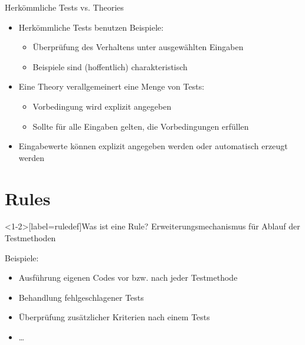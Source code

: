 \begin{frame}{Herkömmliche Tests vs. Theories}
	\begin{itemize}
		\item Herkömmliche Tests benutzen Beispiele:
			\begin{itemize}
				\item Überprüfung des Verhaltens unter ausgewählten Eingaben
				\item Beispiele sind (hoffentlich) charakteristisch
			\end{itemize}
		\item Eine Theory verallgemeinert eine Menge von Tests:
			\begin{itemize}
				\item Vorbedingung wird explizit angegeben
				\item Sollte für alle Eingaben gelten, die Vorbedingungen erfüllen
			\end{itemize}
		\item Eingabewerte können explizit angegeben werden oder automatisch erzeugt werden
	\end{itemize}
\end{frame}


{
\date{René Magritte, Golconda}
\part{Rules}
}

\begin{frame}<1-2>[label=ruledef]{Was ist eine Rule?}
	Erweiterungsmechanismus für Ablauf der Testmethoden
	\begin{block}{Beispiele:}
		\begin{itemize}
			\item<alert@2> Ausführung eigenen Codes vor bzw. nach jeder Testmethode
			\item<alert@3>  Behandlung fehlgeschlagener Tests
			\item Überprüfung zusätzlicher Kriterien nach einem Tests
			\item \dots
		\end{itemize}
	\end{block}
\end{frame}

